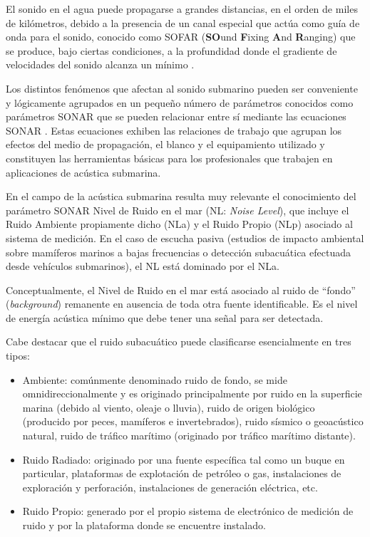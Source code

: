 El sonido en el agua puede propagarse a grandes distancias, en el orden de miles de kilómetros, debido a la presencia de un canal especial que actúa como guía de onda para el sonido, conocido como SOFAR (\textbf{SO}und \textbf{F}ixing \textbf{A}nd \textbf{R}anging) que se produce, bajo ciertas condiciones, a la profundidad donde el gradiente de velocidades del sonido alcanza un mínimo \citep{medwin1997fundamentals}. 

Los distintos fenómenos que afectan al sonido submarino pueden ser conveniente y lógicamente agrupados en un pequeño número de parámetros conocidos como parámetros SONAR que se pueden relacionar entre sí mediante las ecuaciones SONAR \citep{urick1975principles}.  Estas ecuaciones exhiben las relaciones de trabajo que agrupan los efectos del medio de propagación, el blanco y el equipamiento utilizado y constituyen las herramientas básicas para los profesionales que trabajen en aplicaciones de acústica submarina. 

En el campo de la acústica submarina resulta muy relevante el conocimiento del parámetro SONAR Nivel de Ruido en el mar (NL: \textit{Noise Level}), que incluye el Ruido Ambiente propiamente dicho (NLa) y el Ruido Propio (NLp) asociado al sistema de medición. En el caso de escucha pasiva (estudios de impacto ambiental sobre mamíferos marinos a bajas frecuencias o detección subacuática efectuada desde vehículos submarinos), el NL está dominado por el NLa.

Conceptualmente, el Nivel de Ruido en el mar está asociado al ruido de ``fondo'' (\textit{background}) remanente en ausencia de toda otra fuente identificable. Es el nivel de energía acústica mínimo que debe tener una señal para ser detectada.

Cabe destacar que el ruido subacuático puede clasificarse esencialmente en tres tipos:

\begin{itemize}
	\item Ambiente: comúnmente denominado ruido de fondo, se mide omnidireccionalmente y es originado principalmente por ruido en la superficie marina (debido al viento, oleaje o lluvia), ruido de origen biológico (producido por peces, mamíferos e invertebrados), ruido sísmico o geoacústico natural, ruido de tráfico marítimo (originado por tráfico marítimo distante).
	\item Ruido Radiado: originado por una fuente específica tal como un buque en particular, plataformas de explotación de petróleo o gas, instalaciones de exploración y perforación, instalaciones de generación eléctrica, etc.
	\item Ruido Propio: generado por el propio sistema de electrónico de medición de ruido y por la plataforma donde se encuentre instalado.
\end{itemize} 

